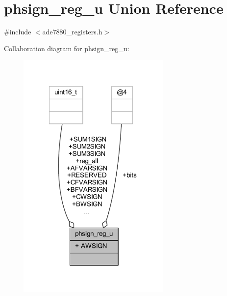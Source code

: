 \hypertarget{a00031}{\section{phsign\-\_\-reg\-\_\-u Union Reference}
\label{df/d61/a00031}
}


{\ttfamily \#include $<$ade7880\-\_\-registers.\-h$>$}



Collaboration diagram for phsign\-\_\-reg\-\_\-u\-:\nopagebreak
\begin{figure}[H]
\begin{center}
\leavevmode
\includegraphics[width=214pt]{d9/df8/a00096}
\end{center}
\end{figure}
